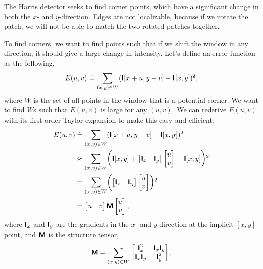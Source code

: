 \begin{marginfigure}
    \centering
    \caption{The Harris detector seeks to find corner points, which have a
    significant change in both the $x$- and $y$-direction. Edges are not
    localizable, because if we rotate the patch, we will not be able to match
    the two rotated patches together.}
    \label{fig:patch-uniqueness}
\end{marginfigure}

To find corners, we want to find points such that if we shift the window in any
direction, it should give a large change in intensity. Let's define an error
function as the following, \[
  E(u,v) \doteq \sum_{(x,y)\in W} (\bm{\mathsf{I}}[x+u,y+v]-\bm{\mathsf{I}}[x,y])^2
,\]
where $W$ is the set of all points in the window that is a potential corner.
We want to find $W$s such that $E(u,v)$ is large for any $(u,v)$. We can
rederive $E(u,v)$ with its first-order Taylor expansion to make this easy and
efficient:
\begin{align*}
  E(u,v) &\doteq \sum_{(x,y)\in W} (\tens{I}[x+u,y+v]-\tens{I}[x,y])^2 \\
  &\approx \sum_{(x,y)\in W} \lft( \tens{I}[x,y]+\begin{bmatrix} \tens{I}_x & \tens{I}_y \end{bmatrix}\begin{bmatrix} u \\ v \end{bmatrix} - \tens{I}[x,y] \rgt)^2 \\
  &= \sum_{(x,y)\in W} \lft( \begin{bmatrix} \tens{I}_x & \tens{I}_y \end{bmatrix} \begin{bmatrix} u \\ v \end{bmatrix} \rgt)^2 \\
  &= \begin{bmatrix} u & v \end{bmatrix} \tens{M} \begin{bmatrix} u \\ v \end{bmatrix}
,\end{align*}
where $\bm{\mathsf{I}}_x$ and $\bm{\mathsf{I}}_y$ are the gradients in the $x$- and
$y$-direction at the implicit $[x,y]$ point, and $\bm{\mathsf{M}}$ is the structure
tensor, \[
  \bm{\mathsf{M}} = \sum_{(x,y)\in W} \begin{bmatrix} \bm{\mathsf{I}}_x^2 & \bm{\mathsf{I}}_x\bm{\mathsf{I}}_y \\ \bm{\mathsf{I}}_x\bm{\mathsf{I}}_y & \bm{\mathsf{I}}_y^2 \end{bmatrix}
.\]

